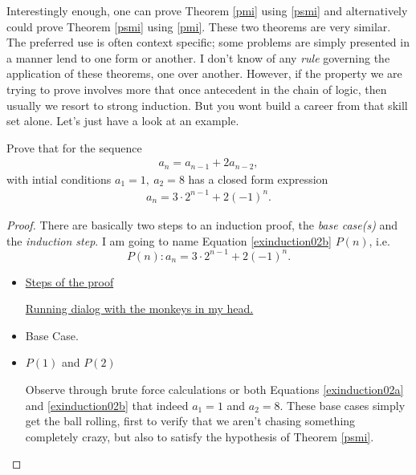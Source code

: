 Interestingly enough, one can prove Theorem \ref{pmi} using \ref{psmi} and alternatively could prove Theorem \ref{psmi} using \ref{pmi}.  These two theorems are very similar.  The preferred use is often context specific; some problems are simply presented in a manner lend to one form or another.  I don't know of any \emph{rule} governing the application of these theorems, one over another.  However, if the property we are trying to prove involves more that once antecedent in the chain of logic, then usually we resort to strong induction.  But you wont build a career from that skill set alone.  Let's just have a look at an example.

\newpage
\begin{example}[$a_1 =1, a_2 = 8 \land a_n = a_{n-1} + 2a_{n-2}, ~\forall ~n>3$]
Prove that for the sequence
\begin{eqnarray}
 a_n = a_{n-1} + 2a_{n-2}, \label{exinduction02a}
 \end{eqnarray}
   with intial conditions $a_1 =1,  ~a_2 = 8$  has a closed form expression 
 \begin{eqnarray}
 a_n = 3\cdot 2^{n-1} + 2(-1)^n. \label{exinduction02b}
 \end{eqnarray}
 

\begin{proof} There are basically two steps to an induction proof, the \emph{base case(s)} and the \emph{induction step}.  I am going to name Equation \ref{exinduction02b} $P(n)$, i.e.   
$$P(n): a_n = 3\cdot 2^{n-1} + 2(-1)^n.$$
\begin{itemize}

\item[] \begin{minipage}{0.3\textwidth}
\underline{Steps of the proof}
\end{minipage}
\hfill\begin{minipage}{0.6\textwidth}\underline{Running dialog  with the monkeys in my head.}
\end{minipage}

\item Base Case.

\item[] \begin{minipage}[t]{0.3\textwidth}$P(1)$ and $P(2)$ 
\end{minipage}
\hfill\begin{minipage}[t]{0.6\textwidth}Observe through brute force calculations or both Equations \ref{exinduction02a} and \ref{exinduction02b} that indeed $a_1 = 1$ and $a_2 = 8$. These base cases simply get the ball rolling, first to verify that we aren't chasing something completely crazy, but also to satisfy the hypothesis of Theorem \ref{psmi}.
\end{minipage}


\end{itemize}
\end{proof}
\end{example}
